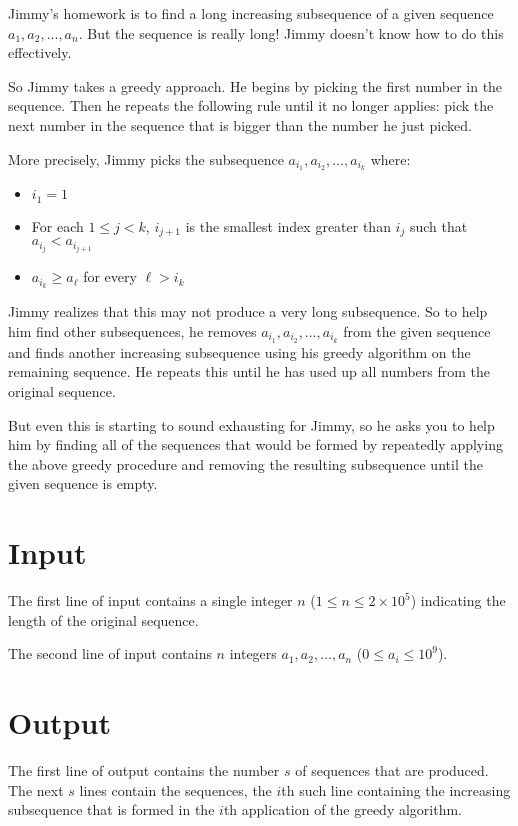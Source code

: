 
Jimmy's homework is to find a long increasing subsequence of a given sequence $a_1, a_2, \ldots, a_n$. But the sequence is really long! Jimmy doesn't know how to do this effectively.

So Jimmy takes a greedy approach. He begins by picking the first number in the sequence. Then he repeats the following rule until it no longer applies: pick the next number in the sequence that is bigger than the number he just picked.

More precisely, Jimmy picks the subsequence $a_{i_1}, a_{i_2}, \ldots, a_{i_k}$ where:
\begin{itemize}
  \item $i_1 = 1$
  \item For each $1 \leq j < k$, $i_{j+1}$ is the smallest index greater than $i_j$ such that $a_{i_j} < a_{i_{j+1}}$
  \item $a_{i_k} \geq a_\ell$ for every $\ell > i_k$
\end{itemize}

Jimmy realizes that this may not produce a very long subsequence. So to help him find other subsequences, he removes $a_{i_1}, a_{i_2}, \ldots, a_{i_k}$ from the given sequence and finds another increasing subsequence using his greedy algorithm on the remaining sequence. He repeats this until he has used up all numbers from the original sequence.

But even this is starting to sound exhausting for Jimmy, so he asks you to help him by finding all of the sequences that would be formed by repeatedly applying the above greedy procedure and removing the resulting subsequence until the given sequence is empty.

\section*{Input}
The first line of input contains a single integer $n$ ($1 \leq n \leq 2 
\times 10^5$) indicating the length of the original sequence.

The second line of input contains $n$ integers $a_1, a_2, \ldots, a_n$ ($0 \leq a_i \leq 10^9$).

\section*{Output}
The first line of output contains the number $s$ of sequences that are produced. The next $s$ lines contain the sequences, the $i$th such line containing the increasing subsequence that is formed in the $i$th application of the greedy algorithm.
